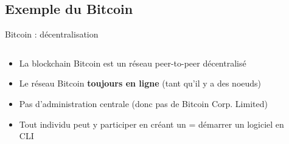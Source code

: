 \subsection{Exemple du Bitcoin}

\begin{frame}{Bitcoin : décentralisation}
  \begin{columns}
    \begin{column}{0.6\textwidth}
      \begin{itemize}
        \item La blockchain Bitcoin est un réseau peer-to-peer décentralisé
        \item Le réseau Bitcoin \textbf{toujours en ligne} (tant qu'il y a des noeuds)
        \item Pas d'administration centrale (donc pas de Bitcoin Corp. Limited)
        \item Tout individu peut y participer en créant un  = démarrer un logiciel en CLI
      \end{itemize}
    \end{column}

    \begin{column}{0.4\textwidth}
      
    \end{column}
  \end{columns}
\end{frame}

